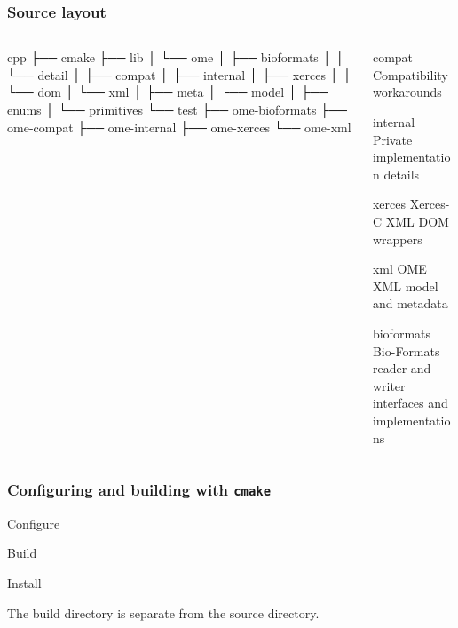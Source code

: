 \documentclass{beamer}
\begin{document}
\begin{frame}[fragile]
  \frametitle{Source layout}
  \begin{columns}
    \begin{column}{.5\linewidth}
      \begin{semiverbatim}\tiny
cpp
├── cmake
├── lib
│   └── ome
│       ├── bioformats
│       │   └── detail
│       ├── compat
│       ├── internal
│       ├── xerces
│       │   └── dom
│       └── xml
│           ├── meta
│           └── model
│               ├── enums
│               └── primitives
└── test
    ├── ome-bioformats
    ├── ome-compat
    ├── ome-internal
    ├── ome-xerces
    └── ome-xml
\end{semiverbatim}
      \end{column}
    \begin{column}{.5\linewidth}
      \begin{block}{compat}
        Compatibility workarounds
      \end{block}
      \begin{block}{internal}
        Private implementation details
      \end{block}
      \begin{block}{xerces}
        Xerces-C XML DOM wrappers
      \end{block}
      \begin{block}{xml}
        OME XML model and metadata
      \end{block}
      \begin{block}{bioformats}
        Bio-Formats reader and writer interfaces and implementations
      \end{block}
    \end{column}
  \end{columns}
\end{frame}

\begin{frame}[fragile]
  \frametitle{Configuring and building with \texttt{cmake}}
\begin{block}{Configure}
  \begin{semiverbatim}\footnotesize
\end{semiverbatim}
\end{block}
\begin{block}{Build}
  \begin{semiverbatim}\footnotesize
\end{semiverbatim}
\end{block}
\begin{block}{Install}
  \begin{semiverbatim}\footnotesize
\end{semiverbatim}
\end{block}
The build directory is separate from the source directory.
\end{frame}
\end{document}

